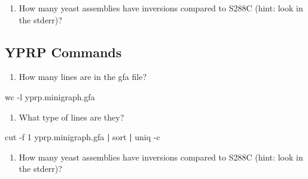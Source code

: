 \documentclass[
]{book}
\newenvironment{Shaded}{\begin{snugshade}}{\end{snugshade}}
\newcommand{\AttributeTok}[1]{\textcolor[rgb]{0.77,0.63,0.00}{#1}}
\newcommand{\FunctionTok}[1]{\textcolor[rgb]{0.00,0.00,0.00}{#1}}
\newcommand{\KeywordTok}[1]{\textcolor[rgb]{0.13,0.29,0.53}{\textbf{#1}}}
\newcommand{\NormalTok}[1]{#1}
\providecommand{\tightlist}{%
  \setlength{\itemsep}{0pt}\setlength{\parskip}{0pt}}
\begin{document}
\begin{enumerate}
\def\labelenumi{\arabic{enumi}.}
\setcounter{enumi}{2}
\tightlist
\item
  How many yeast assemblies have inversions compared to S288C (hint: look in the stderr)?
\end{enumerate}

\begin{Shaded}
\begin{Highlighting}[]

\end{Highlighting}
\end{Shaded}

\hypertarget{yprp-commands}{%
\subsection*{YPRP Commands}\label{yprp-commands}}

\begin{enumerate}
\def\labelenumi{\arabic{enumi}.}
\tightlist
\item
  How many lines are in the gfa file?
\end{enumerate}

\begin{Shaded}
\begin{Highlighting}[]
\FunctionTok{wc} \AttributeTok{{-}l}\NormalTok{ yprp.minigraph.gfa}
\end{Highlighting}
\end{Shaded}

\begin{enumerate}
\def\labelenumi{\arabic{enumi}.}
\setcounter{enumi}{1}
\tightlist
\item
  What type of lines are they?
\end{enumerate}

\begin{Shaded}
\begin{Highlighting}[]
\FunctionTok{cut} \AttributeTok{{-}f}\NormalTok{ 1 yprp.minigraph.gfa }\KeywordTok{|} \FunctionTok{sort} \KeywordTok{|} \FunctionTok{uniq} \AttributeTok{{-}c}
\end{Highlighting}
\end{Shaded}

\begin{enumerate}
\def\labelenumi{\arabic{enumi}.}
\setcounter{enumi}{2}
\tightlist
\item
  How many yeast assemblies have inversions compared to S288C (hint: look in the stderr)?
\end{enumerate}
\end{document}
